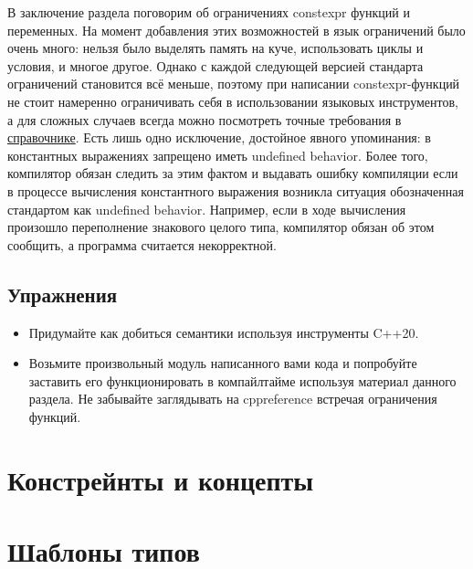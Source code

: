 В заключение раздела поговорим об ограничениях constexpr функций и переменных. На момент добавления этих возможностей в язык ограничений было очень много: нельзя было выделять память на куче, использовать циклы и условия, и многое другое. Однако с каждой следующей версией стандарта ограничений становится всё меньше, поэтому при написании constexpr-функций не стоит намеренно ограничивать себя в использовании языковых инструментов, а для сложных случаев всегда можно посмотреть точные требования в \href{https://en.cppreference.com/w/cpp/language/constexpr#:~:text=A%20constexpr%20function%20must%20satisfy%20the%20following%20requirements%3A}{справочнике}. Есть лишь одно исключение, достойное явного упоминания: в константных выражениях запрещено иметь undefined behavior. Более того, компилятор обязан следить за этим фактом и выдавать ошибку компиляции если в процессе вычисления константного выражения возникла ситуация обозначенная стандартом как undefined behavior. Например, если в ходе вычисления произошло переполнение знакового целого типа, компилятор обязан об этом сообщить, а программа считается некорректной.


\subsection*{Упражнения}
\begin{itemize}
\item Придумайте как добиться семантики  используя инструменты C++20.
\item Возьмите произвольный модуль написанного вами кода и попробуйте заставить его функционировать в компайлтайме используя материал данного раздела. Не забывайте заглядывать на cppreference встречая ограничения  функций.
\end{itemize}

\section{Констрейнты и концепты}


\section{Шаблоны типов}
